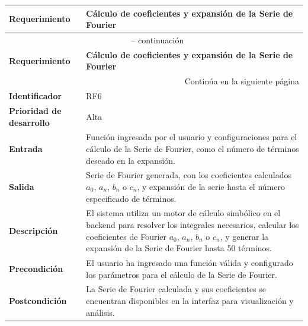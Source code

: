 \begin{longtable}{|m{3.5cm}|m{9.5cm}|}
	\hline
	\rowcolor{black!75} \color{white}\textbf{Requerimiento} & \color{white}\textbf{Cálculo de coeficientes y expansión de la Serie de Fourier} \\
	\hline
	\endfirsthead
	\multicolumn{2}{c}{{\tablename\ \thetable{} -- continuación}} \\
	\hline
	\rowcolor{black!75} \color{white}\textbf{Requerimiento} & \color{white}\textbf{Cálculo de coeficientes y expansión de la Serie de Fourier} \\
	\hline
	\endhead
	\hline \multicolumn{2}{r}{{Continúa en la siguiente página}} \\
	\endfoot
	\hline
	\endlastfoot
	
	\textbf{Identificador} & RF6 \\
	\hline
	\textbf{Prioridad de desarrollo} & Alta \\
	\hline
	\textbf{Entrada} & Función ingresada por el usuario y configuraciones para el cálculo de la Serie de Fourier, como el número de términos deseado en la expansión. \\
	\hline
	\textbf{Salida} & Serie de Fourier generada, con los coeficientes calculados \( a_0 \), \( a_n \), \( b_n \) o \( c_n \), y expansión de la serie hasta el número especificado de términos. \\
	\hline
	\textbf{Descripción} & El sistema utiliza un motor de cálculo simbólico en el backend para resolver los integrales necesarios, calcular los coeficientes de Fourier \( a_0 \), \( a_n \), \( b_n \) o \( c_n \), y generar la expansión de la Serie de Fourier hasta 50 términos. \\
	\hline
	\textbf{Precondición} & El usuario ha ingresado una función válida y configurado los parámetros para el cálculo de la Serie de Fourier. \\
	\hline
	\textbf{Postcondición} & La Serie de Fourier calculada y sus coeficientes se encuentran disponibles en la interfaz para visualización y análisis. \\
	\hline
\end{longtable}
\caption{Requerimiento funcional No. 6} \label{tabla:RF6}
\vspace{0.5cm}

